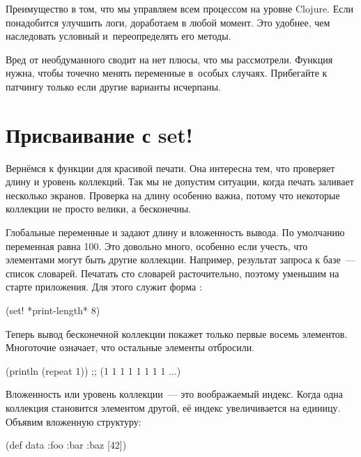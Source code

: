 Преимущество в том, что мы управляем всем процессом на уровне Clojure. Если
понадобится улучшить логи, доработаем  в любой момент. Это
удобнее, чем наследовать условный 
и~переопределять его методы.

Вред от необдуманного  сводит на нет плюсы, что мы
рассмотрели. Функция нужна, чтобы точечно менять переменные в~особых
случаях. Прибегайте к патчингу только если другие варианты исчерпаны.

\section{Присваивание с set!}


Вернёмся к функции  для красивой печати. Она интересна тем, что
проверяет длину и уровень коллекций. Так мы не допустим ситуации, когда печать
заливает несколько экранов. Проверка на длину особенно важна, потому что
некоторые коллекции не просто велики, а бесконечны.


Глобальные переменные  и  задают длину
и вложенность вывода. По умолчанию переменная  равна 100. Это довольно
много, особенно если учесть, что элементами могут быть другие
коллекции. Например, результат запроса к базе~--- список словарей. Печатать сто
словарей расточительно, поэтому уменьшим  на старте
приложения. Для этого служит форма :

\begin{clojure}
(set! *print-length* 8)
\end{clojure}

Теперь вывод бесконечной коллекции покажет только первые восемь
элементов. Многоточие означает, что остальные элементы отбросили.

\begin{clojure}
(println (repeat 1))
;; (1 1 1 1 1 1 1 1 ...)
\end{clojure}

Вложенность или уровень коллекции~--- это воображаемый индекс. Когда одна коллекция
становится элементом другой, её индекс увеличивается на единицу. Объявим
вложенную структуру:

\begin{clojure}
(def data {:foo
            {:bar
              {:baz [42]}}})
\end{clojure}

